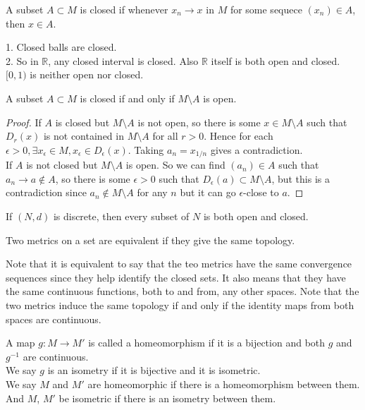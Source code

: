 \begin{definition}
    A subset $A\subset M$ is closed if whenever $x_n\to x$ in $M$ for some sequece $(x_n)\in A$, then $x\in A$.
\end{definition}
\begin{example}
    1. Closed balls are closed.\\
    2. So in $\mathbb R$, any closed interval is closed.
    Also $\mathbb R$ itself is both open and closed.
    $[0,1)$ is neither open nor closed.
\end{example}
\begin{lemma}\label{metric_complement}
    A subset $A\subset M$ is closed if and only if $M\setminus A$ is open.
\end{lemma}
\begin{proof}
    If $A$ is closed but $M\setminus A$ is not open, so there is some $x\in M\setminus A$ such that $D_r(x)$ is not contained in $M\setminus A$ for all $r>0$.
    Hence for each $\epsilon>0, \exists x_\epsilon \in M, x_\epsilon\in D_\epsilon(x)$.
    Taking $a_n=x_{1/n}$ gives a contradiction.\\
    If $A$ is not closed but $M\setminus A$ is open.
    So we can find $(a_n)\in A$ such that $a_n\to a\notin A$, so there is some $\epsilon>0$ such that $D_\epsilon(a)\subset M\setminus A$, but this is a contradiction since $a_n\notin M\setminus A$ for any $n$ but it can go $\epsilon$-close to $a$.
\end{proof}
\begin{example}
    If $(N,d)$ is discrete, then every subset of $N$ is both open and closed.
\end{example}
\begin{definition}
    Two metrics on a set are equivalent if they give the same topology.
\end{definition}
Note that it is equivalent to say that the teo metrics have the same convergence sequences since they help identify the closed sets.
It also means that they have the same continuous functions, both to and from, any other spaces.
Note that the two metrics induce the same topology if and only if the identity maps from both spaces are continuous.
\begin{definition}
    A map $g:M\to M'$ is called a homeomorphism if it is a bijection and both $g$ and $g^{-1}$ are continuous.\\
    We say $g$ is an isometry if it is bijective and it is isometric.\\
    We say $M$ and $M'$ are homeomorphic if there is a homeomorphism between them.
    And $M$, $M'$ be isometric if there is an isometry between them.
\end{definition}
